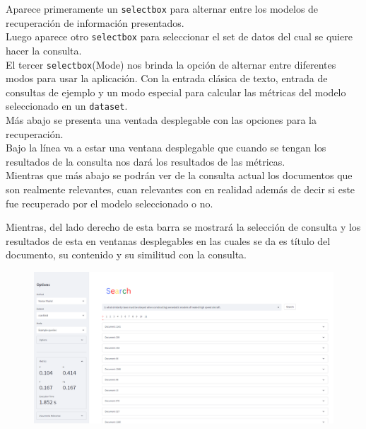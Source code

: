 \documentclass[spanish]{article}
\begin{document}
\begin{multicols}{2}
		Aparece primeramente un \texttt{selectbox} para alternar entre los modelos de recuperación de información presentados.\\

		Luego aparece otro \texttt{selectbox} para seleccionar el set de datos del cual se quiere hacer la consulta.\\

		El tercer \texttt{selectbox}(Mode) nos brinda la opción de alternar entre diferentes modos para usar la aplicación. Con la entrada clásica de texto, entrada de consultas de ejemplo y un modo especial para calcular las métricas del modelo seleccionado en un \texttt{dataset}. \\

		Más abajo se presenta una ventada desplegable con las opciones para la recuperación.\\

		Bajo la línea va a estar una ventana desplegable que cuando se tengan los resultados de la consulta nos dará los resultados de las métricas.\\

		Mientras que más abajo se podrán ver de la consulta actual los documentos que son realmente relevantes, cuan relevantes con en realidad además de decir si este fue recuperado por el modelo seleccionado o no.\\
	\end{multicols}
		

		Mientras, del lado derecho de esta barra se mostrará la selección de consulta y los resultados de esta en ventanas desplegables en las cuales se da es título del documento, su contenido y su similitud con la consulta.

		\begin{figure}[H]
			\includegraphics[scale=0.38]{fullscreen.png}
		\end{figure}
		
\end{document}
